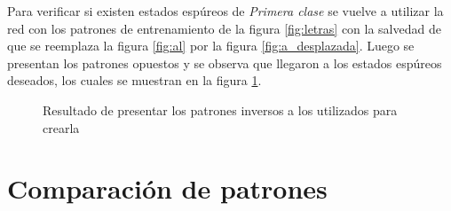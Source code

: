 \documentclass{sig-alternate}
\begin{document}
Para verificar si existen estados espúreos de \textit{Primera clase} se vuelve a utilizar la red con los patrones de entrenamiento de la figura \ref{fig:letras} con la salvedad de que se reemplaza la figura \ref{fig:al} por la figura \ref{fig:a_desplazada}. Luego se presentan los patrones opuestos y se observa que llegaron a los estados espúreos deseados, los cuales se muestran en la figura \ref{fig:letras_espureas}.

	\begin{figure}[h]
		\begin{center}
			\hspace{20pt}
			\hspace{20pt}
		\end{center}
	\caption{Resultado de presentar los patrones inversos a los utilizados para crearla}
	\label{fig:letras_espureas}
	\end{figure}


\section*{Comparación de patrones}
\end{document}
